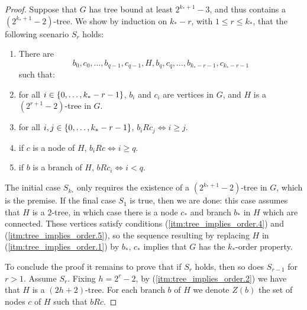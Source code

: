 \begin{proof}
            Suppose that $G$ has tree bound at least $2^{k_*+1}-3$, and thus contains a $(2^{k_*+1}-2)$-tree.
            We show by induction on $k_*-r$, with $1 \leq r \leq k_*$, that the following scenario $S_r$ holds:
            \begin{enumerate}
                \item\label{itm:tree_implies_order.1} There are
                    \[
                        b_0, c_0, \dots, b_{q-1}, c_{q-1}, H, b_q, c_q, \dots, b_{k_*-r-1}, c_{k_*-r-1}
                    \]
                    such that:
                \item\label{itm:tree_implies_order.2} for all $i \in \left\{ 0, \dots, k_*-r-1 \right\}$, $b_i$ and $c_i$ are vertices in $G$,
                    and $H$ is a $(2^{r+1}-2)$-tree in $G$.
                \item\label{itm:tree_implies_order.3} for all $i,j \in \left\{ 0, \dots, k_*-r-1 \right\}$, $b_i R c_j \Leftrightarrow i \geq j$.
                \item\label{itm:tree_implies_order.4} if $c$ is a node of $H$, $b_i R c \Leftrightarrow i \geq q$.
                \item\label{itm:tree_implies_order.5} if $b$ is a branch of $H$, $b R c_i \Leftrightarrow i < q$.
            \end{enumerate}

            The initial case $S_{k_*}$ only requires the existence of a $(2^{k_*+1}-2)$-tree in $G$, which is the premise.
            If the final case $S_1$ is true, then we are done:
            this case assumes that $H$ is a $2$-tree, in which case there is a node $c_*$ and branch $b_*$ in $H$ which
            are connected.
            These vertices satisfy conditions (\ref{itm:tree_implies_order.4}) and (\ref{itm:tree_implies_order.5}), so
            the sequence resulting by replacing $H$ in (\ref{itm:tree_implies_order.1}) by $b_*$, $c_*$ implies that $G$
            has the $k_*$-order property.

            To conclude the proof it remains to prove that if $S_r$ holds, then so does $S_{r-1}$ for $r>1$.
            Assume $S_r$.
            Fixing $h = 2^r - 2$, by (\ref{itm:tree_implies_order.2}) we have that $H$ is a $(2h +2)$-tree.
            For each branch $b$ of $H$ we denote $Z(b)$ the set of nodes $c$ of $H$ such that $b R c$.


\end{proof}
